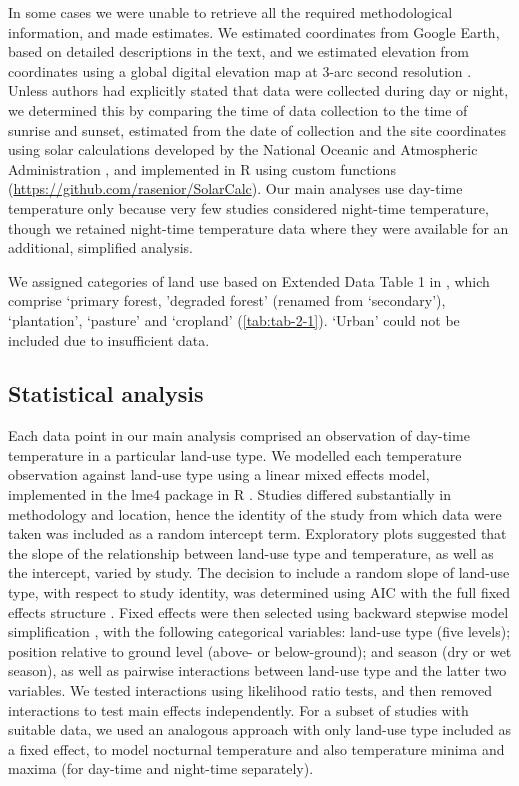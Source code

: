 \documentclass[12pt,a4paper,]{report}
\theoremstyle{definition}
\theoremstyle{definition}
\theoremstyle{definition}
\theoremstyle{remark}
\begin{document}
In some cases we were unable to retrieve all the required methodological
information, and made estimates. We estimated coordinates from Google
Earth, based on detailed descriptions in the text, and we estimated
elevation from coordinates using a global digital elevation map at 3-arc
second resolution \citep{nasa_srtm2017}. Unless authors had explicitly
stated that data were collected during day or night, we determined this
by comparing the time of data collection to the time of sunrise and
sunset, estimated from the date of collection and the site coordinates
using solar calculations developed by the National Oceanic and
Atmospheric Administration \citep{noaa_solar}, and implemented in R
using custom functions (\url{https://github.com/rasenior/SolarCalc}).
Our main analyses use day-time temperature only because very few studies
considered night-time temperature, though we retained night-time
temperature data where they were available for an additional, simplified
analysis.

We assigned categories of land use based on Extended Data Table 1 in
\citet{newbold_global2015}, which comprise `primary forest, 'degraded
forest' (renamed from `secondary'), `plantation', `pasture' and
`cropland' (\autoref{tab:tab-2-1}). `Urban' could not be included due to
insufficient data.

\subsection{Statistical analysis}\label{statistical-analysis}

Each data point in our main analysis comprised an observation of
day-time temperature in a particular land-use type. We modelled each
temperature observation against land-use type using a linear mixed
effects model, implemented in the lme4 package \citep{bates_fitting2015}
in R \citep{r_core_team_r:2017}. Studies differed substantially in
methodology and location, hence the identity of the study from which
data were taken was included as a random intercept term. Exploratory
plots suggested that the slope of the relationship between land-use type
and temperature, as well as the intercept, varied by study. The decision
to include a random slope of land-use type, with respect to study
identity, was determined using AIC with the full fixed effects structure
\citep{zuur_mixed2009}. Fixed effects were then selected using backward
stepwise model simplification \citep{zuur_mixed2009}, with the following
categorical variables: land-use type (five levels); position relative to
ground level (above- or below-ground); and season (dry or wet season),
as well as pairwise interactions between land-use type and the latter
two variables. We tested interactions using likelihood ratio tests, and
then removed interactions to test main effects independently. For a
subset of studies with suitable data, we used an analogous approach with
only land-use type included as a fixed effect, to model nocturnal
temperature and also temperature minima and maxima (for day-time and
night-time separately).
\end{document}
